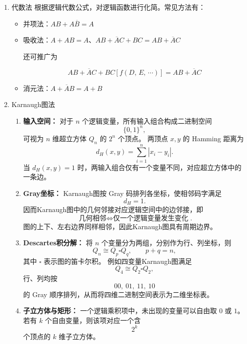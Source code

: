\documentclass[UTF8,fontset=fandol,zihao=5]{ctexart}
\begin{document}
\begin{enumerate}

  \item 代数法
    根据逻辑代数公式，对逻辑函数进行化简。常见方法有：
    \begin{itemize}
      \item 并项法：$AB+A\overline{B}=A$
      \item 吸收法：$A+AB=A$、$AB+\overline{A}C+BC=AB+\overline{A}C$
      
      还可推广为

      \[
      AB+\overline{A}C+BC[f(D,\,E,\,\cdots)]=AB+\overline{A}C
      \]
      \item 消元法：$A+\overline{A}B=A+B$
    \end{itemize}

  \item Karnaugh图法

\begin{methodbox}[Karnaugh图的数学结构]

\begin{enumerate}
    \item \textbf{输入空间：}
    对于 $n$ 个逻辑变量，所有输入组合构成二进制空间
    \[
        \{0,1\}^n,
    \]
    可视为 $n$ 维超立方体 $Q_n$ 的 $2^n$ 个顶点。
    两顶点 $x,y$ 的 Hamming 距离为
    \[
        d_H(x,y)=\sum_{i=1}^n |x_i-y_i|.
    \]
    当 $d_H(x,y)=1$ 时，两输入组合仅有一个变量不同，对应超立方体中的一条边。

    \item \textbf{Gray坐标：}
    Karnaugh图按 Gray 码排列各坐标，使相邻码字满足
    \[
        d_H=1.
    \]
    因而Karnaugh图中的几何邻接对应逻辑空间中的边邻接，即
    \[
        \boxed{\text{几何相邻}
        \Longleftrightarrow
        \text{仅一个逻辑变量发生变化}}.
    \]
    图的上下、左右边界同样相邻，因此Karnaugh图具有周期边界。

    \item \textbf{Descartes积分解：}
    将 $n$ 个变量分为两组，分别作为行、列坐标，则
    \[
        Q_n \cong Q_p \square Q_q,
        \qquad p+q=n,
    \]
    其中 $\square$ 表示图的笛卡尔积。
    例如四变量Karnaugh图满足
    \[
        Q_4\cong Q_2\square Q_2,
    \]
    行、列均按
    \[
        00,\ 01,\ 11,\ 10
    \]
    的 Gray 顺序排列，从而将四维二进制空间表示为二维坐标表。

    \item \textbf{子立方体与矩形：}
    一个逻辑乘积项中，未出现的变量可以自由取 $0$ 或 $1$。
    若有 $k$ 个自由变量，则该项对应一个含
    \[
        2^k
    \]
    个顶点的 $k$ 维子立方体。


\end{enumerate}
\end{methodbox}
\end{enumerate}
\end{document}
